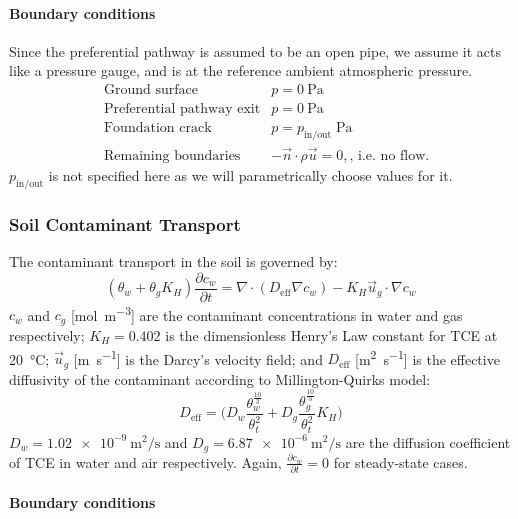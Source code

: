 \paragraph{Boundary conditions}

Since the preferential pathway is assumed to be an open pipe, we assume it acts like a pressure gauge, and is at the reference ambient atmospheric pressure.
\begin{align*}
    &\text{Ground surface} &p = \SI{0}{\pascal} \\
    &\text{Preferential pathway exit} &p = \SI{0}{\pascal} \\
    &\text{Foundation crack} &p = p_\mathrm{in/out} \; \si{\pascal} \\
    &\text{Remaining boundaries} &-\vec{n}\cdot\rho\vec{u} = 0, \text{, i.e. no flow.}
\end{align*}
$p_\mathrm{in/out}$ is not specified here as we will parametrically choose values for it.\par

\subsubsection{Soil Contaminant Transport}

The contaminant transport in the soil is governed by:
\begin{equation*}
  (\theta_w + \theta_g K_H) \frac{\partial c_w}{\partial t} = \nabla \cdot (D_\mathrm{eff} \nabla c_w) - K_H \vec{u}_g \cdot \nabla c_w
\end{equation*}
$c_w$ and $c_g$ [\si{\mol\per\metre\cubed}] are the contaminant concentrations in water and gas respectively;
$K_H = 0.402$ is the dimensionless Henry's Law constant for TCE at \SI{20}{\degreeCelsius};
$\vec{u}_g$ [\si{\metre\per\second}] is the Darcy's velocity field;
and $D_\mathrm{eff}$ [\si{\metre\squared\per\second}] is the effective diffusivity of the contaminant according to Millington-Quirks model:
\begin{equation*}
  D_\mathrm{eff} = \Big(D_w \frac{\theta_w^{\frac{10}{3}}}{\theta_t^2} + D_g \frac{\theta_g^{\frac{10}{3}}}{\theta_t^2} K_H\Big)
\end{equation*}
$D_w = \SI{1.02e-9}{\metre\squared\per\second}$ and $D_g = \SI{6.87e-6}{\metre\squared\per\second}$ are the diffusion coefficient of TCE in water and air respectively.
Again, $\frac{\partial c_w}{\partial t} = 0$ for steady-state cases.\par

\paragraph{Boundary conditions}

